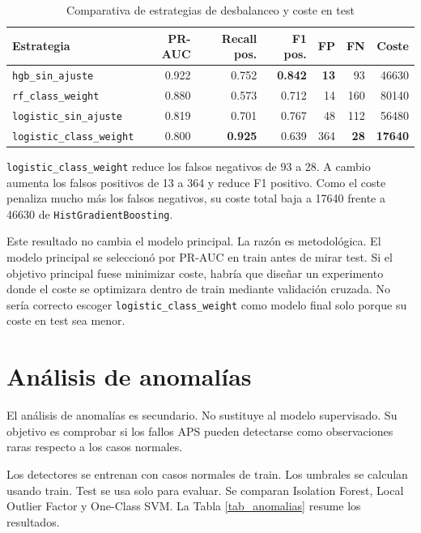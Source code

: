 \documentclass[11pt,a4paper]{article}
\begin{document}
\begin{table}[H]
\centering
\caption{Comparativa de estrategias de desbalanceo y coste en test}
\label{tab_coste}
\small
\begin{tabular}{@{}lrrrrrr@{}}
\toprule
\textbf{Estrategia} & \textbf{PR-AUC} & \textbf{Recall pos.} & \textbf{F1 pos.} & \textbf{FP} & \textbf{FN} & \textbf{Coste}\\
\midrule
\rowcolor{bestrow} \texttt{hgb\_sin\_ajuste} & 0.922 & 0.752 & \textbf{0.842} & \textbf{13} & 93 & 46630\\
\texttt{rf\_class\_weight} & 0.880 & 0.573 & 0.712 & 14 & 160 & 80140\\
\texttt{logistic\_sin\_ajuste} & 0.819 & 0.701 & 0.767 & 48 & 112 & 56480\\
\rowcolor{altrow} \texttt{logistic\_class\_weight} & 0.800 & \textbf{0.925} & 0.639 & 364 & \textbf{28} & \textbf{17640}\\
\bottomrule
\end{tabular}
\end{table}

\texttt{logistic\_class\_weight} reduce los falsos negativos de 93 a 28. A cambio aumenta los falsos positivos de 13 a 364 y reduce F1 positivo. Como el coste penaliza mucho más los falsos negativos, su coste total baja a 17640 frente a 46630 de \texttt{HistGradientBoosting}.

Este resultado no cambia el modelo principal. La razón es metodológica. El modelo principal se seleccionó por PR-AUC en train antes de mirar test. Si el objetivo principal fuese minimizar coste, habría que diseñar un experimento donde el coste se optimizara dentro de train mediante validación cruzada. No sería correcto escoger \texttt{logistic\_class\_weight} como modelo final solo porque su coste en test sea menor.

\section{Análisis de anomalías}
\label{sec_anomalias}

El análisis de anomalías es secundario. No sustituye al modelo supervisado. Su objetivo es comprobar si los fallos APS pueden detectarse como observaciones raras respecto a los casos normales.

Los detectores se entrenan con casos normales de train. Los umbrales se calculan usando train. Test se usa solo para evaluar. Se comparan Isolation Forest, Local Outlier Factor y One-Class SVM. La Tabla \ref{tab_anomalias} resume los resultados.
\end{document}

